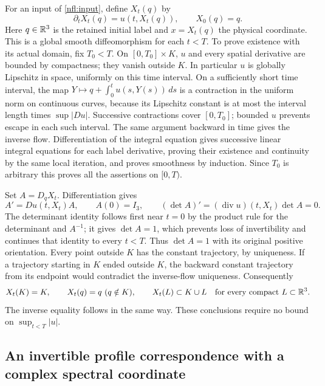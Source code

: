 For an input of \eqref{nfl:input}, define $X_t(q)$ by
\[
 \partial_tX_t(q)=u(t,X_t(q)),\qquad X_0(q)=q.
\]
Here $q\in\mathbb R^3$ is the retained initial label and $x=X_t(q)$ the physical
coordinate. This is a global smooth diffeomorphism for each $t<T$.
To prove existence with its actual domain, fix $T_0<T$. On
$[0,T_0]\times K$, $u$ and every spatial derivative are bounded by
compactness; they vanish outside $K$. In particular $u$ is globally
Lipschitz in space, uniformly on this time interval. On a sufficiently
short time interval, the map
$Y\mapsto q+\int_0^t u(s,Y(s))\,ds$ is a contraction in the uniform
norm on continuous curves, because its Lipschitz constant is at most
the interval length times $\sup|Du|$. Successive contractions cover
$[0,T_0]$; bounded $u$ prevents escape in each such interval. The same
argument backward in time gives the inverse flow. Differentiation of
the integral equation gives successive linear integral equations for
each label derivative, proving their existence and continuity by the
same local iteration, and proves smoothness by induction. Since $T_0$
is arbitrary this proves all the assertions on $[0,T)$.

Set $A=D_qX_t$. Differentiation gives
\[
 A'=Du(t,X_t)A,\qquad A(0)=I_3,\qquad
 (\det A)'=(\operatorname{div}u)(t,X_t)\det A=0.
\]
The determinant identity follows first near $t=0$ by the product rule
for the determinant and $A^{-1}$; it gives $\det A=1$, which prevents
loss of invertibility and continues that identity to every $t<T$.
Thus $\det A=1$ with its original positive orientation. Every point
outside $K$ has the constant trajectory, by uniqueness. If a trajectory
starting in $K$ ended outside $K$, the backward constant trajectory
from its endpoint would contradict the inverse-flow uniqueness.
Consequently
\begin{equation}
 X_t(K)=K,\qquad X_t(q)=q\ (q\notin K),\qquad
 X_t(L)\subset K\cup L\quad\hbox{for every compact }L\subset\mathbb R^3.
 \label{nfl:compact}
\end{equation}
The inverse equality follows in the same way. These conclusions require
no bound on $\sup_{t<T}|u|$.

\subsection{An invertible profile correspondence with a complex spectral coordinate}

